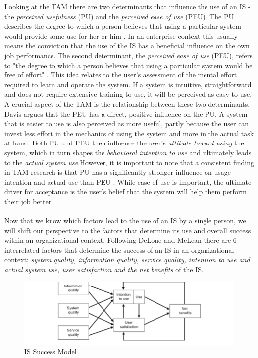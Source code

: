 \documentclass[
	english,
	ruledheaders=section,%
	class=report,%
	thesis={type=bachelor},%
	accentcolor=1b,%
	custommargins=true,%
	marginpar=false,%
	parskip=half-,%
	fontsize=11pt,%
	DIV=14,
]{tudapub}
\begin{document}
Looking at the TAM there are two determinants that influence the use of an IS - the \textit{perceived usefulness} (PU) and the \textit{perceived ease of use} (PEU). The PU describes the degree to which a person believes that using a particular system would provide some use for her or him \parencite{Davis1989MISQ}. In an enterprise context this usually means the conviction that the use of the IS has a beneficial influence on the own job performance. The second determinant, the \textit{perceived ease of use} (PEU), refers to "the degree to which a person believes that using a particular system would be free of effort" \parencite[p.~320]{Davis1989MISQ}. This idea relates to the user's assessment of the mental effort required to learn and operate the system. If a system is intuitive, straightforward and does not require extensive training to use, it will be perceived as easy to use.\\ A crucial aspect of the TAM is the relationship between these two determinants. Davis argues that the PEU has a direct, positive influence on the PU. A system that is easier to use is also perceived as more useful, partly because the user can invest less effort in the mechanics of using the system and more in the actual task at hand. Both PU and PEU then influence the user's \textit{attitude toward using} the system, which in turn shapes the \textit{behavioral intention to use} and ultimately leads to the \textit{actual system use}.However, it is important to note that a consistent finding in TAM research is that PU has a significantly stronger influence on usage intention and actual use than PEU \parencite{Davis1989MISQ}. While ease of use is important, the ultimate driver for acceptance is the user's belief that the system will help them perform their job better.\\
\\
Now that we know which factors lead to the use of an IS by a single person, we will shift our perspective to the factors that determine its use and overall success within an organizational context.
Following DeLone and McLean \parencite{DeloneMcLean2003ISSuccessTenYearUpdate} there are 6 interrelated factors that determine the success of an IS in an organizational context: \textit{system quality, information quality, service quality, intention to use and actual system use, user satisfaction and the net benefits} of the IS.\\
\begin{figure}[h!]
    \includegraphics[width=1\linewidth]{images/ISSuccess.png}
    \caption{IS Success Model}
    \label{fig:enter-label}
\end{figure}
\end{document}
